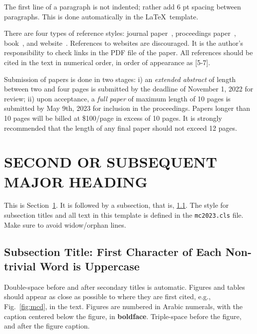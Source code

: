 \documentclass[letterpaper]{mc2023}
\begin{document}
The first line of a paragraph is not indented; rather add 6 pt spacing between 
paragraphs.  This is done automatically in the \LaTeX\ template.

There are four types of reference styles: journal paper~\cite{journal}, 
proceedings paper~\cite{proc_paper}, book~\cite{book}, and website~\cite{website}.
References to websites are discouraged. It 
is the author's responsibility to check links in the PDF file of the paper. 
All references should be cited in the text in numerical order, in order of 
appearance as [5-7].

Submission of papers is done in two stages: i) an {\it extended abstract} of length between two and four pages is submitted by the deadline of November 1, 2022 for review; ii) upon acceptance, a {\it full paper} of maximum length of 10 pages is submitted by May 9th, 2023 for inclusion in the proceedings.    
Papers longer than 10 pages
will be billed at \$100/page in excess of 10 pages.  It is strongly recommended
that the length of any final paper should not exceed 12 pages.

\section{SECOND OR SUBSEQUENT MAJOR HEADING} 
\label{sec:first}

This is Section~\ref{sec:first}. It is followed by a subsection, that is, 
\ref{sec:second}. The style for subsection titles and all text in this template is defined 
in the \texttt{mc2023.cls} file.  Make sure to avoid widow/orphan lines.

\subsection{Subsection Title: First Character of Each Non-trivial Word is Uppercase} 
\label{sec:second}

Double-space before and after secondary titles is automatic.  Figures and 
tables should appear as close as possible to where they are first
cited, e.g., Fig.~\ref{fig:mcd}, in the text.  Figures are numbered in Arabic 
numerals, with the caption centered below the figure, in \textbf{boldface}. 
Triple-space before the figure, and after the figure caption.\\
\end{document}
